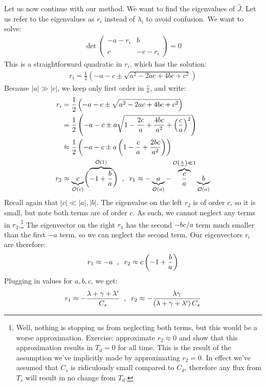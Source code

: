 Let us now continue with our method. We want to find the eigenvalues of $\hat{J}$. Let us refer to the eigenvalues as $r_i$ instead of $\lambda_i$ to avoid confusion. We want to solve:
\begin{align*}
    \det\left( \begin{array}{cc}
        -a-r_i & b \\\\
        c & -c-r_i
    \end{array}
    \right)=0
\end{align*}
This is a straightforward quadratic in $r_i$, which has the solution:
\begin{align*}
    r_i=\frac{1}{2}\left( -a-c \pm \sqrt{a^2-2ac+4bc+c^2} \right)
\end{align*}
Because $|a|\gg |c|$, we keep only first order in $\frac{c}{a}$, and write:
\begin{align*}
    r_i&=\frac{1}{2}\left( -a-c \pm \sqrt{a^2-2ac+4bc+c^2} \right)\\
    &= \frac{1}{2}\left( 
        -a-c \pm a\sqrt{1-\frac{2c}{a}+\frac{4bc}{a^2}+\left( \frac{c}{a} \right)^2}
     \right) \\ 
    &\approx \frac{1}{2}\left( 
        -a-c \pm a\left(1-\frac{c}{a}+\frac{2bc}{a^2}\right)
     \right) 
    \\ 
    r_2&\approx \underbrace{c}_{\mathcal{O}(c)} \biggl( \overbrace{-1+\frac{b}{a}}^{\mathcal{O}(1)} \biggr)
    \hspace{2mm},\hspace{2mm}
    r_1\approx -\underbrace{a}_{\mathcal{O}(a)}-\overbrace{\frac{c}{a}}^{\mathcal{O}\left( \frac{c}{a} \right)\ll 1}\underbrace{b}_{\mathcal{O}(a)}
\end{align*}
Recall again that $|c|\ll |a|,|b|$. The eigenvalue on the left $r_2$ is of order $c$, so it is small, but note both terms are of order $c$. As such, we cannot neglect any terms in $r_2$.\footnote{Well, nothing is stopping us from neglecting both terms, but this would be a worse approximation. Exercise: approximate $r_2\approx 0$ and show that this approximation results in $T_d=0$ for all time. This is the result of the assumption we've implicitly made by approximating $r_2=0$. In effect we've assumed that $C_s$ is ridiculously small compared to $C_d$, therefore any flux from $T_s$ will result in no change from $T_d$.} The eigenvector on the right $r_1$ has the second $-bc/a$ term much smaller than the first $-a$ term, so we can neglect the second term. Our eigenvectors $r_i$ are therefore:
\begin{align*}
    r_1\approx-a\hspace{2mm},\hspace{2mm} r_2\approx c\left(-1 +\frac{b}{a}\right)
\end{align*}
Plugging in values for $a,b,c$, we get:
\begin{align*}
    r_1\approx-\frac{\lambda+\gamma+\lambda'}{C_s}\hspace{2mm},\hspace{2mm}
    r_2\approx-\frac{\lambda\gamma}{\left( \lambda+\gamma+\lambda' \right)C_s}
\end{align*}

